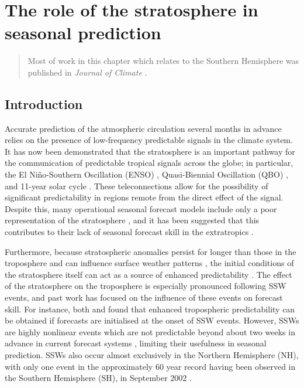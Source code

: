 \chapter{The role of the stratosphere in seasonal prediction}
\label{cha:seas}

\begin{quotation}
  Most of work in this chapter which relates to the Southern Hemisphere was
  published in \emph{Journal of Climate} \citep{Seviour2014}.
\end{quotation}


\section{Introduction}
\label{sec:seas-introduction}

Accurate prediction of the atmospheric circulation several months in advance
relies on the presence of low-frequency predictable signals in the climate
system. It has now been demonstrated that the stratosphere is an important
pathway for the communication of predictable tropical signals across the globe;
in particular, the El Ni\~no-Southern Oscillation (ENSO) \citep{Bell2009,
  Ineson2009, Hurwitz2011}, Quasi-Biennial Oscillation (QBO)
\citep{Marshall2009, Garfinkel2011}, and 11-year solar cycle \citep{Haigh2003,
  Gray2013}. These teleconnections allow for the possibility of significant
predictability in regions remote from the direct effect of the signal. Despite
this, many operational seasonal forecast models include only a poor
representation of the stratosphere \citep{Maycock2011}, and it has been
suggested that this contributes to their lack of seasonal forecast skill in the
extratropics \citep{Smith2012}.

Furthermore, because stratospheric anomalies persist for longer than those in
the troposphere and can influence surface weather patterns
\citep[e.g.,][]{Baldwin2001a}, the initial conditions of the stratosphere itself
can act as a source of enhanced predictability \citep{Baldwin2003a,
  Charlton2003, Hardiman2011}. The effect of the stratosphere on the troposphere
is especially pronounced following SSW events, and past work has focused on the
influence of these events on forecast skill. For instance, both
\citet{Kuroda2008} and \citet{Sigmond2013} found that enhanced tropospheric
predictability can be obtained if forecasts are initialised at the onset of SSW
events. However, SSWs are highly nonlinear events which are not predictable
beyond about two weeks in advance in current forecast systems
\citep{Marshall2010}, limiting their usefulness in seasonal prediction. SSWs
also occur almost exclusively in the Northern Hemisphere (NH), with only one
event in the approximately 60 year record having been observed in the Southern
Hemisphere (SH), in September 2002 \citep{Roscoe2005}.

